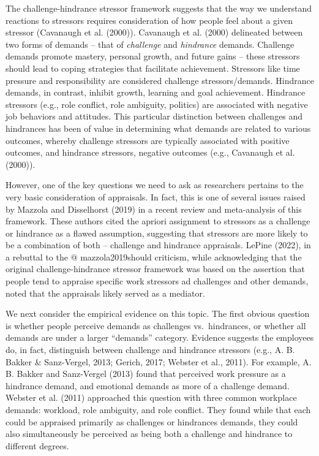 \documentclass[
  english,
  man]{apa6}
\begin{document}
The challenge-hindrance stressor framework suggests that the way we understand reactions to stressors requires consideration of how people feel about a given stressor (Cavanaugh et al. (2000)). Cavanaugh et al. (2000) delineated between two forms of demands -- that of \emph{challenge} and \emph{hindrance} demands. Challenge demands promote mastery, personal growth, and future gains -- these stressors should lead to coping strategies that facilitate achievement. Stressors like time pressure and responsibility are considered challenge stressors/demands. Hindrance demands, in contrast, inhibit growth, learning and goal achievement. Hindrance stressors (e.g., role conflict, role ambiguity, politics) are associated with negative job behaviors and attitudes. This particular distinction between challenges and hindrances has been of value in determining what demands are related to various outcomes, whereby challenge stressors are typically associated with positive outcomes, and hindrance stressors, negative outcomes (e.g., Cavanaugh et al. (2000)).

However, one of the key questions we need to ask as researchers pertains to the very basic consideration of appraisals. In fact, this is one of several issues raised by Mazzola and Disselhorst (2019) in a recent review and meta-analysis of this framework. These authors cited the apriori assignment to stressors as a challenge or hindrance as a flawed assumption, suggesting that stressors are more likely to be a combination of both -- challenge and hindrance appraisals. LePine (2022), in a rebuttal to the @ mazzola2019should criticism, while acknowledging that the original challenge-hindrance stressor framework was based on the assertion that people tend to appraise specific work stressors ad challenges and other demands, noted that the appraisals likely served as a mediator.

We next consider the empirical evidence on this topic. The first obvious question is whether people perceive demands as challenges vs.~hindrances, or whether all demands are under a larger ``demands'' category. Evidence suggests the employees do, in fact, distinguish between challenge and hindrance stressors (e.g., A. B. Bakker \& Sanz-Vergel, 2013; Gerich, 2017; Webster et al., 2011). For example, A. B. Bakker and Sanz-Vergel (2013) found that perceived work pressure as a hindrance demand, and emotional demands as more of a challenge demand. Webster et al. (2011) approached this question with three common workplace demands: workload, role ambiguity, and role conflict. They found while that each could be appraised primarily as challenges or hindrances demands, they could also simultaneously be perceived as being both a challenge and hindrance to different degrees.
\end{document}
